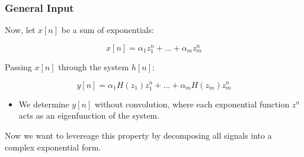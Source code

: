 \subsubsection{General Input}
\begin{derivation}
    Now, let \( x[n] \) be a sum of exponentials:

    \[
    x[n] = \alpha_1 z_1^n + \dots + \alpha_m z_m^n
    \]

    Passing \( x[n] \) through the system \( h[n] \):

    \begin{center}
    \end{center}

    \[
    y[n] = \alpha_1 H(z_1) z_1^n + \dots + \alpha_m H(z_m) z_m^n
    \]

    \begin{itemize}
        \item We determine \( y[n] \) without convolution, where each exponential function \( z^n \) acts as an eigenfunction of the system.
    \end{itemize}
\end{derivation}

\begin{warning}
    Now we want to levereage this property by decomposing all signals into a complex exponential form.
\end{warning}

